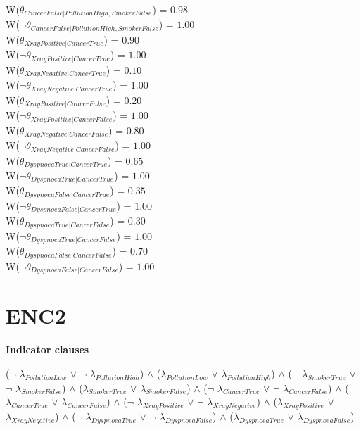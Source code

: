 \documentclass[a4paper,10pt]{report}
\begin{document}
W($\theta_{CancerFalse|PollutionHigh,SmokerFalse}$) = $0.98$\\ 
W($\neg\theta_{CancerFalse|PollutionHigh,SmokerFalse}$) = $1.00$\\ 
W($\theta_{XrayPositive|CancerTrue}$) = $0.90$\\ 
W($\neg\theta_{XrayPositive|CancerTrue}$) = $1.00$\\ 
W($\theta_{XrayNegative|CancerTrue}$) = $0.10$\\ 
W($\neg\theta_{XrayNegative|CancerTrue}$) = $1.00$\\ 
W($\theta_{XrayPositive|CancerFalse}$) = $0.20$\\ 
W($\neg\theta_{XrayPositive|CancerFalse}$) = $1.00$\\ 
W($\theta_{XrayNegative|CancerFalse}$) = $0.80$\\ 
W($\neg\theta_{XrayNegative|CancerFalse}$) = $1.00$\\ 
W($\theta_{DyspnoeaTrue|CancerTrue}$) = $0.65$\\ 
W($\neg\theta_{DyspnoeaTrue|CancerTrue}$) = $1.00$\\ 
W($\theta_{DyspnoeaFalse|CancerTrue}$) = $0.35$\\ 
W($\neg\theta_{DyspnoeaFalse|CancerTrue}$) = $1.00$\\ 
W($\theta_{DyspnoeaTrue|CancerFalse}$) = $0.30$\\ 
W($\neg\theta_{DyspnoeaTrue|CancerFalse}$) = $1.00$\\ 
W($\theta_{DyspnoeaFalse|CancerFalse}$) = $0.70$\\ 
W($\neg\theta_{DyspnoeaFalse|CancerFalse}$) = $1.00$\\ 

\section{ENC2}
\label{ENC2}
\textbf{Indicator clauses}\\
\begin{center}
	($\neg$ $\lambda_{PollutionLow}$ $\lor$ $\neg$ $\lambda_{PollutionHigh}$) $\land$ 
($\lambda_{PollutionLow}$ $\lor$ $\lambda_{PollutionHigh}$) $\land$ 
($\neg$ $\lambda_{SmokerTrue}$ $\lor$ $\neg$ $\lambda_{SmokerFalse}$) $\land$ 
($\lambda_{SmokerTrue}$ $\lor$ $\lambda_{SmokerFalse}$) $\land$ 
($\neg$ $\lambda_{CancerTrue}$ $\lor$ $\neg$ $\lambda_{CancerFalse}$) $\land$ 
($\lambda_{CancerTrue}$ $\lor$ $\lambda_{CancerFalse}$) $\land$ 
($\neg$ $\lambda_{XrayPositive}$ $\lor$ $\neg$ $\lambda_{XrayNegative}$) $\land$ 
($\lambda_{XrayPositive}$ $\lor$ $\lambda_{XrayNegative}$) $\land$ 
($\neg$ $\lambda_{DyspnoeaTrue}$ $\lor$ $\neg$ $\lambda_{DyspnoeaFalse}$) $\land$ 
($\lambda_{DyspnoeaTrue}$ $\lor$ $\lambda_{DyspnoeaFalse}$)
\end{center}
\end{document}
